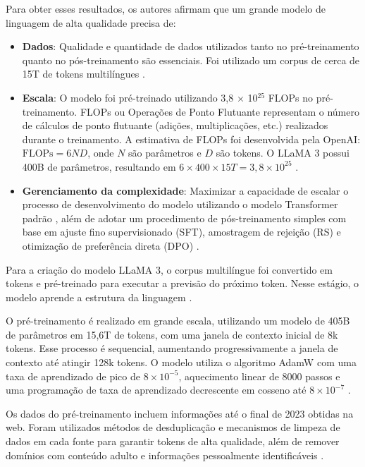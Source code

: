 Para obter esses resultados, os autores afirmam que um grande modelo de linguagem de alta qualidade precisa de:

\begin{itemize}
    \item \textbf{Dados}: Qualidade e quantidade de dados utilizados tanto no pré-treinamento quanto no pós-treinamento são essenciais. Foi utilizado um corpus de cerca de 15T de tokens multilíngues \cite{llama3}.
    \item \textbf{Escala}: O modelo foi pré-treinado utilizando 3,8 \(\times\) 10\(^{25}\) FLOPs no pré-treinamento. FLOPs ou Operações de Ponto Flutuante representam o número de cálculos de ponto flutuante (adições, multiplicações, etc.) realizados durante o treinamento. A estimativa de FLOPs foi desenvolvida pela OpenAI: \(\text{FLOPs} = 6ND\), onde \(N\) são parâmetros e \(D\) são tokens. O LLaMA 3 possui 400B de parâmetros, resultando em \(6 \times 400 \times 15T = 3,8 \times 10^{25}\) \cite{llama3}.
    \item \textbf{Gerenciamento da complexidade}: Maximizar a capacidade de escalar o processo de desenvolvimento do modelo utilizando o modelo Transformer padrão \cite{vaswani2017}, além de adotar um procedimento de pós-treinamento simples com base em ajuste fino supervisionado (SFT), amostragem de rejeição (RS) e otimização de preferência direta (DPO) \cite{rafailov2024}.
\end{itemize}

Para a criação do modelo LLaMA 3, o corpus multilíngue foi convertido em tokens e pré-treinado para executar a previsão do próximo token. Nesse estágio, o modelo aprende a estrutura da linguagem \cite{llama3}.

O pré-treinamento é realizado em grande escala, utilizando um modelo de 405B de parâmetros em 15,6T de tokens, com uma janela de contexto inicial de 8k tokens. Esse processo é sequencial, aumentando progressivamente a janela de contexto até atingir 128k tokens. O modelo utiliza o algoritmo AdamW com uma taxa de aprendizado de pico de \(8 \times 10^{-5}\), aquecimento linear de 8000 passos e uma programação de taxa de aprendizado decrescente em cosseno até \(8 \times 10^{-7}\) \cite{llama3}.

Os dados do pré-treinamento incluem informações até o final de 2023 obtidas na web. Foram utilizados métodos de desduplicação e mecanismos de limpeza de dados em cada fonte para garantir tokens de alta qualidade, além de remover domínios com conteúdo adulto e informações pessoalmente identificáveis \cite{llama3}.

